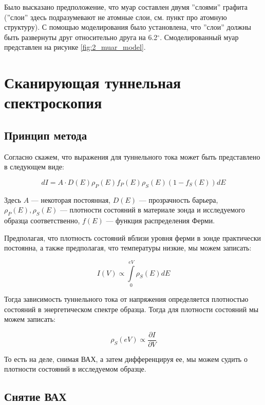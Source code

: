 \documentclass[a4paper, 12pt]{article}
\begin{document}
	Было высказано предположение, что муар составлен двумя ''слоями'' графита (''слои'' здесь подразумевают не атомные слои, см. пункт про атомную структуру). С помощью моделирования было установлена, что ''слои'' должны быть развернуты друг относительно друга на 6.2$^\circ$. Смоделированный муар представлен на рисунке \ref{fig:2_muar_model}.
	
	\section{Сканирующая туннельная спектроскопия}
	
	\subsection{Принцип метода}
	
	Согласно \cite{Mironov} скажем, что выражения для туннельного тока может быть представлено в следующем виде:
	
	\begin{equation}
		dI = A \cdot D(E) \rho_P (E) f_P(E) \rho_S(E)(1 - f_S(E)) dE
	\end{equation}
	
	Здесь $A$ --- некоторая постоянная, $D(E)$ --- прозрачность барьера, $\rho_P(E), \rho_S(E)$ --- плотности состояний в материале зонда и исследуемого образца соответственно, $f(E)$ --- функция распределения Ферми.
	
	Предполагая, что плотность состояний вблизи уровня ферми в зонде практически постоянна, а также предполагая, что температуры низкие, мы можем записать:
	
	\begin{equation}
		I(V) \propto \int\limits_0^{eV} \rho_S(E)dE 
	\end{equation} 
	
	Тогда зависимость туннельного тока от напряжения определяется плотностью состояний в энергетическом спектре образца. Тогда для плотности состояний мы можем записать:
	
	\begin{equation}
		\rho_S(eV) \propto \frac{\partial I}{\partial V}
	\end{equation}
	
	То есть на деле, снимая ВАХ, а затем дифференцируя ее, мы можем судить о плотности состояний в исследуемом образце.
	
	\subsection{Снятие ВАХ}
	
\end{document}
